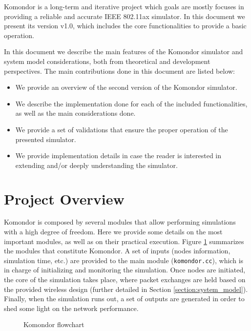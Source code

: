 \documentclass[a4paper]{article}
\begin{document}
Komondor is a long-term and iterative project which goals are mostly focuses in providing a reliable and accurate IEEE 802.11ax simulator. In this document we present its version v1.0, which includes the core functionalities to provide a basic operation.
	
In this document we describe the main features of the Komondor simulator and system model considerations, both from theoretical and development perspectives. The main contributions done in this document are listed below:
\begin{itemize}
	\item We provide an overview of the second version of the Komondor simulator.
	\item We describe the implementation done for each of the included functionalities, as well as the main considerations done.
	\item We provide a set of validations that ensure the proper operation of the presented simulator.
	\item We provide implementation details in case the reader is interested in extending and/or deeply understanding the simulator.
\end{itemize}	
	
\section{Project Overview}
\label{section:project_overview}

Komondor is composed by several modules that allow performing simulations with a high degree of freedom. Here we provide some details on the most important modules, as well as on their practical execution. Figure \ref{fig:komondor_flowchart} summarizes the modules that constitute Komondor. A set of inputs (nodes information, simulation time, etc.) are provided to the main module (\texttt{komondor.cc}), which is in charge of initializing and monitoring the simulation. Once nodes are initiated, the core of the simulation takes place, where packet exchanges are held based on the provided wireless design (further detailed in Section \ref{section:system_model}). Finally, when the simulation runs out, a set of outputs are generated in order to shed some light on the network performance.
\begin{figure}[h!]
	\centering
	\caption{Komondor flowchart}
	\label{fig:komondor_flowchart}
\end{figure}		
\end{document}
